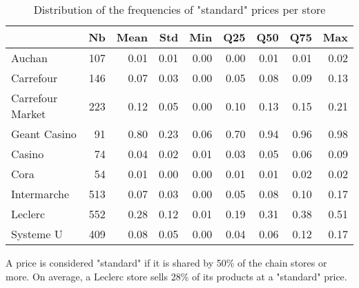 \documentclass[english]{article}
\begin{document}
\begin{table}[H]
\caption{Distribution of the frequencies of "standard" prices per store}
\label{tab:qlmc_store_freq_50}
\begin{threeparttable}
\renewcommand{\arraystretch}{0.7}%
\small
\begin{tabular}{lrrrrrrrr}
\toprule
\toprule
{}                &  Nb &  Mean &  Std &  Min &  Q25 &  Q50 &  Q75 &  Max \\
\midrule
Auchan            & 107 &  0.01 & 0.01 & 0.00 & 0.00 & 0.01 & 0.01 & 0.02 \\
Carrefour         & 146 &  0.07 & 0.03 & 0.00 & 0.05 & 0.08 & 0.09 & 0.13 \\
Carrefour Market  & 223 &  0.12 & 0.05 & 0.00 & 0.10 & 0.13 & 0.15 & 0.21 \\
Geant Casino      &  91 &  0.80 & 0.23 & 0.06 & 0.70 & 0.94 & 0.96 & 0.98 \\
Casino            &  74 &  0.04 & 0.02 & 0.01 & 0.03 & 0.05 & 0.06 & 0.09 \\
Cora              &  54 &  0.01 & 0.00 & 0.00 & 0.01 & 0.01 & 0.02 & 0.02 \\
Intermarche       & 513 &  0.07 & 0.03 & 0.00 & 0.05 & 0.08 & 0.10 & 0.17 \\
Leclerc           & 552 &  0.28 & 0.12 & 0.01 & 0.19 & 0.31 & 0.38 & 0.51 \\
Systeme U         & 409 &  0.08 & 0.05 & 0.00 & 0.04 & 0.06 & 0.12 & 0.17 \\
\bottomrule
\bottomrule
\end{tabular}
\begin{tablenotes}
      \small
      \item A price is considered "standard" if it is shared by 50\% of the chain stores or more. On average, a Leclerc store sells 28\% of its products at a "standard" price.
\end{tablenotes}
\end{threeparttable}
\end{table}
\end{document}
